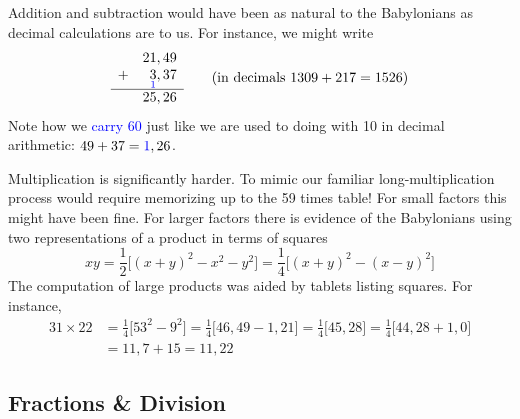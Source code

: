 Addition and subtraction would have been as natural to the Babylonians as decimal calculations are to us. For instance, we might write
\[
	\begin{array}{rr@{,\,}r}
		&21&49\\
		+&\underset{\textcolor{blue}{1}}{3}&37\\\hline
		&25&26\\
	\end{array} 
	\tag{in decimals $1309+217=1526$}
\]
Note how we \textcolor{blue}{carry 60} just like we are used to doing with 10 in decimal arithmetic: $49+37=\textcolor{blue}{1},26$.
\medbreak

Multiplication is significantly harder. To mimic our familiar long-multiplication process would require memorizing up to the 59 times table! For small factors this might have been fine. For larger factors there is evidence of the Babylonians using two representations of a product in terms of squares
\[
	xy=\frac 12\big[(x+y)^2-x^2-y^2\big]
	=\frac 14\big[(x+y)^2-(x-y)^2\big]
\]
The computation of large products was aided by tablets listing squares. For instance,
\begin{align*}
	31\times 22 &=\frac 14\big[53^2-9^2\big] 
	=\frac 14\big[46,49-1,21\big] 
	=\frac 14\big[45,28\big] 
	=\frac 14\big[44,28+1,0\big]\\
	&=11,7+15=11,22 \tag{$=682$}
\end{align*}





\subsection*{Fractions \& Division}\label{babfraction}

